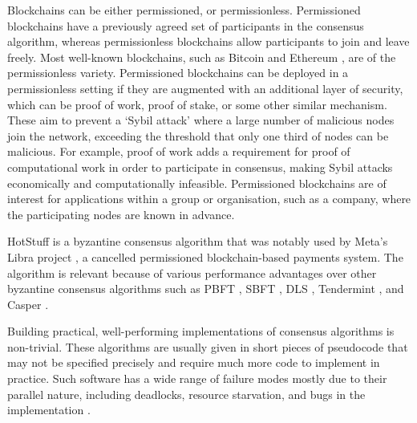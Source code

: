 Blockchains can be either permissioned, or permissionless. Permissioned blockchains have a previously agreed set of participants in the consensus algorithm, whereas permissionless blockchains allow participants to join and leave freely. Most well-known blockchains, such as Bitcoin \cite{nakamotoBitcoinPeertoPeerElectronic2008} and Ethereum \cite{ethereumWhite, ethereumYellow}, are of the permissionless variety. Permissioned blockchains can be deployed in a permissionless setting if they are augmented with an additional layer of security, which can be proof of work, proof of stake, or some other similar mechanism. These aim to prevent a `Sybil attack' where a large number of malicious nodes join the network, exceeding the threshold that only one third of nodes can be malicious. For example, proof of work adds a requirement for proof of computational work in order to participate in consensus, making Sybil attacks economically and computationally infeasible. Permissioned blockchains are of interest for applications within a group or organisation, such as a company, where the participating nodes are known in advance.

HotStuff is a byzantine consensus algorithm that was notably used by Meta's Libra project \cite{baudetStateMachineReplication2019}, a cancelled permissioned blockchain-based payments system. The algorithm is relevant because of various performance advantages over other byzantine consensus algorithms such as PBFT \cite{castroPracticalByzantineFault1999}, SBFT \cite{golanguetaSBFTScalableDecentralized2019}, DLS \cite{dworkConsensusPresencePartial1988}, Tendermint \cite{kwonTendermintConsensusMining2014}, and Casper \cite{buterinCasperFriendlyFinality2019}.

Building practical, well-performing implementations of consensus algorithms is non-trivial. These algorithms are usually given in short pieces of pseudocode that may not be specified precisely and require much more code to implement in practice. Such software has a wide range of failure modes mostly due to their parallel nature, including deadlocks, resource starvation, and bugs in the implementation \cite{chandraPaxosMadeLive2007}.

